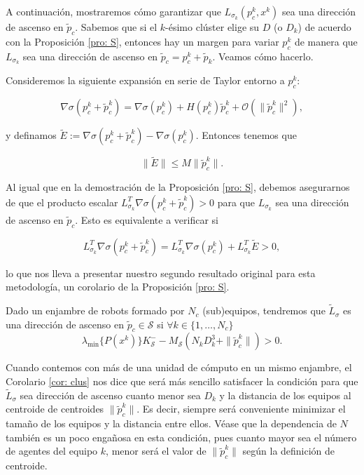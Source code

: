 A continuación, mostraremos cómo garantizar que $L_{\sigma_k}(p_c^k, x^k)$ sea una dirección de ascenso en $\tilde p_c$. Sabemos que si el $k$-ésimo clúster elige su $D$ (o $D_k$) de acuerdo con la Proposición \ref{pro: S}, entonces hay un margen para variar $p_c^k$ de manera que $L_{\sigma_k}$ sea una dirección de ascenso en $\tilde p_c = p_c^k + \tilde p_k$. Veamos cómo hacerlo.

Consideremos la siguiente expansión en serie de Taylor entorno a $p_c^k$:

\begin{equation}
\nabla\sigma(p_c^k + \tilde p_c^k) = \nabla\sigma(p_c^k) + H(p_c^k)\tilde p_c^k + \mathcal{O}(\|\tilde p_c^k\|^2), \nonumber
\end{equation}

\newpage

y definamos $\tilde E := \nabla\sigma(p_c^k + \tilde p_c^k) - \nabla\sigma(p_c^k)$. Entonces tenemos que

\begin{equation}
\| \tilde E \| \leq M \|\tilde p_c^k \|. \nonumber
\end{equation}

Al igual que en la demostración de la Proposición \ref{pro: S}, debemos asegurarnos de que el producto escalar $L_{\sigma_k}^T\nabla\sigma(p_c^k + \tilde p_c^k) > 0$ para que $L_{\sigma_k}$ sea una dirección de ascenso en $\tilde p_c$. Esto es equivalente a verificar si

\begin{equation}
L_{\sigma_k}^T\nabla\sigma(p_c^k + \tilde p_c^k) = L_{\sigma_k}^T\nabla\sigma(p_c^k) + L_{\sigma_k}^T\tilde E > 0, \nonumber
\end{equation}

lo que nos lleva a presentar nuestro segundo resultado original para esta metodología, un corolario de la Proposición \ref{pro: S}.

\begin{coroll} \label{cor: clus}
Dado un enjambre de robots formado por $N_c$ (sub)equipos, tendremos que $\tilde L_\sigma$ es una dirección de ascenso en $\tilde p_c \in \mathcal{S}$ si $\forall k\in\{1,\dots,N_c\}$
\begin{equation}
\lambda_{\text{min}}\{P(x^k)\} K^-_\mathcal{S} - M_\mathcal{S}(N_kD_k^3 + \|\tilde p^k_c\|)> 0. \nonumber
\end{equation}
\end{coroll}

Cuando contemos con más de una unidad de cómputo en un mismo enjambre, el Corolario \ref{cor: clus} nos dice que será más sencillo satisfacer la condición para que $\tilde L_{\sigma}$ sea dirección de ascenso cuanto menor sea $D_k$ y la distancia de los equipos al centroide de centroides $\|\tilde p_c^k\|$. Es decir, siempre será conveniente minimizar el tamaño de los equipos y la distancia entre ellos. Véase que la dependencia de $N$ también es un poco engañosa en esta condición, pues cuanto mayor sea el número de agentes del equipo $k$, menor será el valor de $\|\tilde p_c^k\|$ según la definición de centroide.

